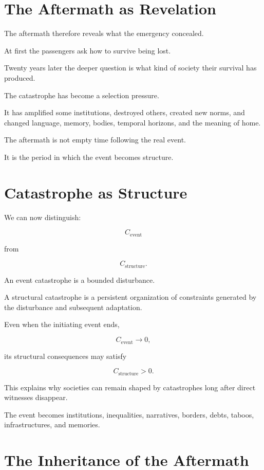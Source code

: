 \documentclass[11pt,oneside]{book}
\theoremstyle{definition}
\theoremstyle{remark}
\begin{document}
\section{The Aftermath as Revelation}

The aftermath therefore reveals what the emergency concealed.

At first the passengers ask how to survive being lost.

Twenty years later the deeper question is what kind of society their survival has produced.

The catastrophe has become a selection pressure.

It has amplified some institutions, destroyed others, created new norms, and changed language, memory, bodies, temporal horizons, and the meaning of home.

The aftermath is not empty time following the real event.

It is the period in which the event becomes structure.

\section{Catastrophe as Structure}

We can now distinguish:

\[
C_{\mathrm{event}}
\]

from

\[
C_{\mathrm{structure}}.
\]

An event catastrophe is a bounded disturbance.

A structural catastrophe is a persistent organization of constraints generated by the disturbance and subsequent adaptation.

Even when the initiating event ends,

\[
C_{\mathrm{event}}\rightarrow0,
\]

its structural consequences may satisfy

\[
C_{\mathrm{structure}}>0.
\]

This explains why societies can remain shaped by catastrophes long after direct witnesses disappear.

The event becomes institutions, inequalities, narratives, borders, debts, taboos, infrastructures, and memories.

\section{The Inheritance of the Aftermath}
\end{document}
